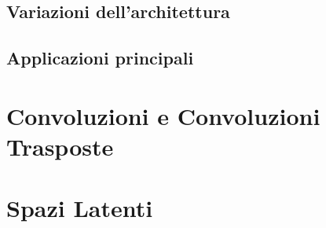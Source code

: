 %
%
\subsection{Variazioni dell'architettura}


\subsection{Applicazioni principali}




\section {Convoluzioni e Convoluzioni Trasposte}
\section {Spazi Latenti}

